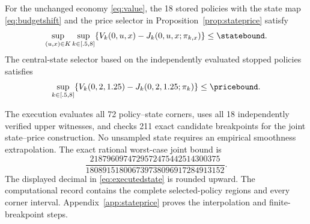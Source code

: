 \begin{proposition}\label{prop:executed}
For the unchanged economy \eqref{eq:value}, the 18 stored policies with the state map \eqref{eq:budgetshift} and the price selector in Proposition~\ref{prop:stateprice} satisfy
\begin{equation}
 \sup_{(u,x)\in K}\sup_{k\in[.5,8]}
 \{V_k(0,u,x)-J_k(0,u,x;\pi_{k,x})\}\leq\statebound.
 \label{eq:executedstate}
\end{equation}
The central-state selector based on the independently evaluated stopped policies satisfies
\begin{equation}
 \sup_{k\in[.5,8]}
 \{V_k(0,2,1.25)-J_k(0,2,1.25;\pi_k)\}\leq\pricebound.
 \label{eq:executedprice}
\end{equation}
\end{proposition}

The execution evaluates all 72 policy--state corners, uses all 18 independently verified upper witnesses, and checks 211 exact candidate breakpoints for the joint state--price construction. No unsampled state requires an empirical smoothness extrapolation. The exact rational worst-case joint bound is
\[
 \frac{2187960974729572475442514300375}{180891518006739738096917284913152}.
\]
The displayed decimal in \eqref{eq:executedstate} is rounded upward. The computational record contains the complete selected-policy regions and every corner interval. Appendix~\ref{app:stateprice} proves the interpolation and finite-breakpoint steps.

